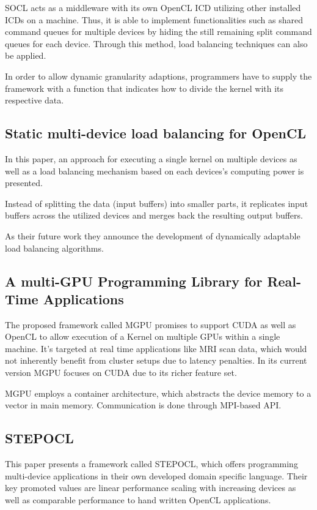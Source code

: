 SOCL acts as a middleware with its own OpenCL ICD utilizing other installed ICDs on a machine. Thus, it is able to implement functionalities such as shared command queues for multiple devices by hiding the still remaining split command queues for each device. Through this method, load balancing techniques can also be applied.

In order to allow dynamic granularity adaptions, programmers have to supply the framework with a function that indicates how to divide the kernel with its respective data.

\subsection{Static multi-device load balancing for OpenCL\cite{delalama_2012}}
In this paper, an approach for executing a single kernel on multiple devices as well as a load balancing mechanism based on each devices's computing power is presented.

Instead of splitting the data (input buffers) into smaller parts, it replicates input buffers across the utilized devices and merges back the resulting output buffers.

As their future work they announce the development of dynamically adaptable load balancing algorithms.


\subsection{A multi-GPU Programming Library for Real-Time Applications\cite{mgpu}}
The proposed framework called MGPU promises to support CUDA as well as OpenCL to allow execution of a Kernel on multiple GPUs within a single machine. It's targeted at real time applications like MRI scan data, which would not inherently benefit from cluster setups due to latency penalties.  In its current version MGPU focuses on CUDA due to its richer feature set.

MGPU employs a container architecture, which abstracts the device memory to a vector in main memory. Communication is done through MPI-based API.


\subsection{STEPOCL\cite{stepocl}}

This paper presents a framework called STEPOCL, which offers programming multi-device applications in their own developed domain specific language. Their key promoted values are linear performance scaling with increasing devices as well as comparable performance to hand written OpenCL applications.

